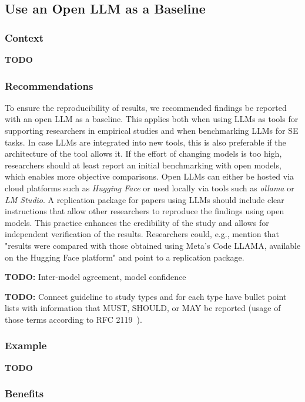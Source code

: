 \documentclass[11pt]{article}
\begin{document}
\subsection{Use an Open LLM as a Baseline}

\subsubsection{Context}

\textbf{TODO}

\subsubsection{Recommendations}

To ensure the reproducibility of results, we recommended findings be reported with an open LLM as a baseline.
This applies both when using LLMs as tools for supporting researchers in empirical studies and when benchmarking LLMs for SE tasks.
In case LLMs are integrated into new tools, this is also preferable if the architecture of the tool allows it.
If the effort of changing models is too high, researchers should at least report an initial benchmarking with open models, which enables more objective comparisons.
Open LLMs can either be hosted via cloud platforms such as \emph{Hugging Face} or used locally via tools such as \emph{ollama} or \emph{LM Studio}.
A replication package for papers using LLMs should include clear instructions that allow other researchers to reproduce the findings using open models.
This practice enhances the credibility of the study and allows for independent verification of the results. 
Researchers could, e.g., mention that "results were compared with those obtained using Meta’s Code LLAMA, available on the Hugging Face platform" and point to a replication package.

\textbf{TODO:} Inter-model agreement, model confidence

\textbf{TODO:} Connect guideline to study types and for each type have bullet point lists with information that MUST, SHOULD, or MAY be reported (usage of those terms according to RFC 2119~\cite{rfc2119}).

\subsubsection{Example}

\textbf{TODO}

\subsubsection{Benefits}
\end{document}
